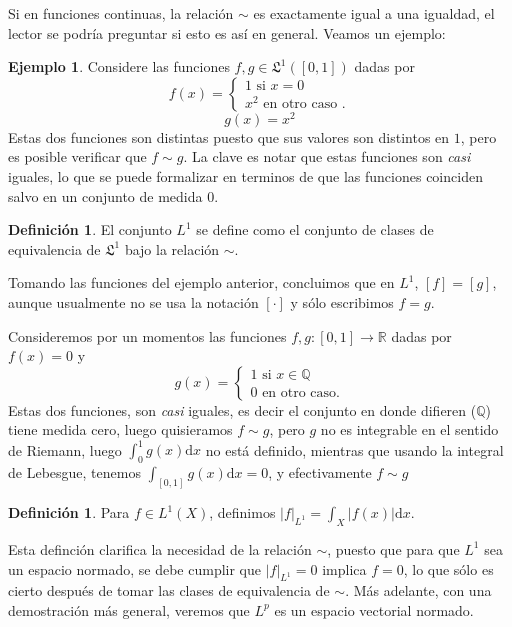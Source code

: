 \documentclass{article}
\theoremstyle{definition}
\newtheorem{defi}[thm]{Definición}
\newtheorem{exa}[thm]{Ejemplo}
\begin{document}
Si en funciones continuas, la relación $\sim$ es exactamente igual a
una igualdad, el lector se podría preguntar si esto es así en general.
Veamos un ejemplo:

\begin{exa}
Considere las funciones $f,g \in \mathfrak{L}^1([0,1])$ dadas por
\[
f(x)=
\begin{cases}
	1 \text{ si } x=0\\
  x^2 \text{ en otro caso }.
\end{cases}
\]
\[
g(x)=x^2
\]
Estas dos funciones son distintas puesto que sus valores son distintos
en $1$, pero es posible verificar que $f\sim g$. La clave es notar que
estas funciones son \textit{casi} iguales, lo que se puede formalizar
en terminos de que las funciones coinciden salvo en un conjunto de
medida $0$.
\end{exa}

\begin{defi}
El conjunto $L^1$ se define como el conjunto de clases de equivalencia
de $\mathfrak{L}^1$ bajo la relación $\sim$.
\end{defi}

Tomando las funciones del ejemplo anterior, concluimos que en $L^1$,
$[f]=[g]$, aunque usualmente no se usa la notación $[\cdot ]$ y
sólo escribimos $f=g$.

Consideremos por un momentos las funciones $f,g \colon [0,1] \to
\mathbb{R}$ dadas por $f(x)=0$ y 
\[
g(x)=
\begin{cases}
1 \text{ si } x\in \mathbb{Q} \\
0 \text{ en otro caso.}
\end{cases}
\]
Estas dos funciones, son \textit{casi} iguales, es decir el conjunto
en donde difieren ($\mathbb{Q}$) tiene medida cero, luego quisieramos
$f\sim g$, pero $g$ no es integrable en el sentido de Riemann, luego
$ \int_{0}^{1} g(x) \text{d}x$ no está definido, mientras que usando
la integral de Lebesgue, tenemos $ \int_{[0,1]}^{} g(x) \text{d}x=0$,
y efectivamente $f\sim g$

\begin{defi}
Para $f\in L^1(X)$, definimos $|f|_{L^1}=\int_{X}^{} |f(x)| \text{d}x$.
\end{defi}

Esta definción clarifica la necesidad de la relación $\sim$, puesto
que para que $L^1$ sea un espacio normado, se debe cumplir que
$|f|_{L^1}=0$ implica $f=0$, lo que sólo es cierto después de tomar
las clases de equivalencia de $\sim$. Más adelante, con una
demostración más general, veremos que $L^p$ es un espacio vectorial
normado.
\end{document}
